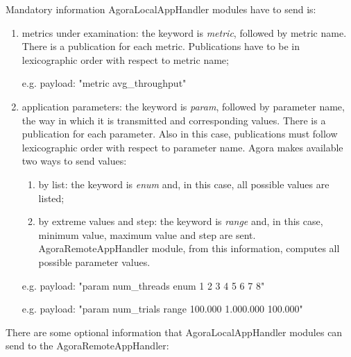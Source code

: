 Mandatory information AgoraLocalAppHandler modules have to send is:

\begin{enumerate}

    \item metrics under examination: the keyword is \textit{metric}, followed by metric name. There is a publication for each metric. Publications have to be in lexicographic order with respect to metric name;
    
    e.g. payload: "metric avg\_throughput"
    
    \item application parameters: the keyword is \textit{param}, followed by parameter name, the way in which it is transmitted and corresponding values. There is a publication for each parameter. Also in this case, publications must follow lexicographic order with respect to parameter name. Agora makes available two ways to send values:
    
    \begin{enumerate}
    
        \item by list: the keyword is \textit{enum} and, in this case, all possible values are listed;
        
        \item by extreme values and step: the keyword is \textit{range} and, in this case, minimum value, maximum value and step are sent. AgoraRemoteAppHandler module, from this information, computes all possible parameter values.
    
    \end{enumerate}
    
    e.g. payload: "param num\_threads enum 1 2 3 4 5 6 7 8"
    
    e.g. payload: "param num\_trials range 100.000 1.000.000 100.000"

\end{enumerate}

There are some optional information that AgoraLocalAppHandler modules can send to the AgoraRemoteAppHandler:

